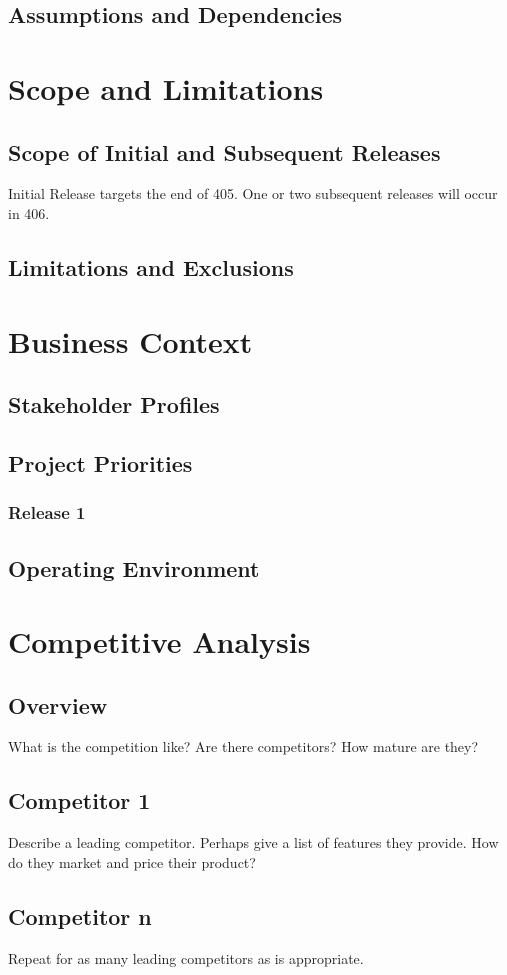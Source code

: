\documentclass[12pt,oneside,letterpaper]{article}
\begin{document}
\subsection{Assumptions and Dependencies}




\section{Scope and Limitations}
\subsection{Scope of Initial and Subsequent Releases}
Initial Release targets the end of 405.  One or two subsequent releases will occur in 406.
\subsection{Limitations and Exclusions}

\section{Business Context}
\subsection{Stakeholder Profiles}
\subsection{Project Priorities}
\subsubsection{Release 1}
\subsection{Operating Environment}

\section{Competitive Analysis}
\subsection{Overview}
What is the competition like?  Are there competitors?  How mature are they?  
\subsection{Competitor 1}
Describe a leading competitor.  Perhaps give a list of features they provide.  How do they market and price their product?
\subsection{Competitor n}
Repeat for as many leading competitors as is appropriate.
\end{document}
